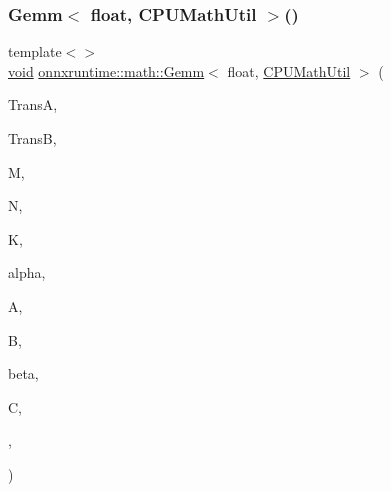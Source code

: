\mbox{\label{namespaceonnxruntime_1_1math_abc3e8a69d5980bcf568ca96dc41c7bc1}} 
\subsubsection{\texorpdfstring{Gemm$<$ float, C\+P\+U\+Math\+Util $>$()}{Gemm< float, CPUMathUtil >()}}
{\footnotesize\ttfamily template$<$$>$ \\
\mbox{\hyperlink{mlasi_8h_a88f941d423cb2a819b70a1358982b1a6}{void}} \mbox{\hyperlink{namespaceonnxruntime_1_1math_a30950f751444e202fe4976dda70cc1fe}{onnxruntime\+::math\+::\+Gemm}}$<$ float, \mbox{\hyperlink{classonnxruntime_1_1CPUMathUtil}{C\+P\+U\+Math\+Util}} $>$ (\begin{DoxyParamCaption}\item[{const \mbox{\hyperlink{cblas_8h_a44dfaddb823648755b110dbad849c5a9}{C\+B\+L\+A\+S\+\_\+\+T\+R\+A\+N\+S\+P\+O\+SE}}}]{TransA,  }\item[{const \mbox{\hyperlink{cblas_8h_a44dfaddb823648755b110dbad849c5a9}{C\+B\+L\+A\+S\+\_\+\+T\+R\+A\+N\+S\+P\+O\+SE}}}]{TransB,  }\item[{const int64\+\_\+t}]{M,  }\item[{const int64\+\_\+t}]{N,  }\item[{const int64\+\_\+t}]{K,  }\item[{const float}]{alpha,  }\item[{const float $\ast$}]{A,  }\item[{const float $\ast$}]{B,  }\item[{const float}]{beta,  }\item[{float $\ast$}]{C,  }\item[{\mbox{\hyperlink{classonnxruntime_1_1CPUMathUtil}{C\+P\+U\+Math\+Util}} $\ast$}]{,  }\item[{\mbox{\hyperlink{namespaceonnxruntime_ad77d0a6e838ec7da5dc35fed5ee66b49}{M\+L\+Data\+Type}}}]{ }\end{DoxyParamCaption})}

\mbox{\label{namespaceonnxruntime_1_1math_ae3525472d980958f066d644d49660a5f}} 
